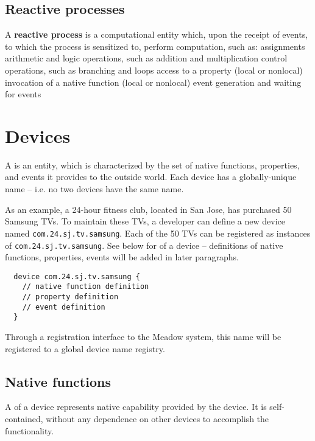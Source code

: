 \documentclass{myproc}
\begin{document}
\subsection{Reactive processes}
A \textcolor{blue2}{\bf{}reactive process} is a computational entity which,
upon the receipt of events, to which the process is sensitized to, 
perform computation, such as:
\bit
\w assignments
\w arithmetic and logic operations, such as addition and multiplication
\w control operations, such as branching and loops
\w access to a property (local or nonlocal)
\w invocation of a native function (local or nonlocal)
\w event generation and waiting for events
\eit


\section{Devices}
A  is an entity, which is characterized by the set of
native functions, properties, and events it provides to the outside world. 
Each device has a globally-unique name -- i.e. no two devices have the 
same name. 

As an example, a 24-hour fitness club, located in San Jose, has
purchased 50 Samsung TVs. To maintain these TVs, a developer can define
a new device named \verb+com.24.sj.tv.samsung+.
Each of the 50 TVs can be registered as instances of
\verb+com.24.sj.tv.samsung+.
See below for  of a device --  definitions of native
functions, properties, events will be added in later paragraphs.
\begin{verbatim}
  device com.24.sj.tv.samsung {
    // native function definition
    // property definition
    // event definition
  }
\end{verbatim}
\textcolor{red2}{Through a registration interface to the Meadow system, this
  name will be registered to a global device name registry.}

\subsection{Native functions}
A  of a device represents native capability provided 
by the device. It is self-contained, without any dependence on other devices 
to accomplish the functionality. 
\end{document}
